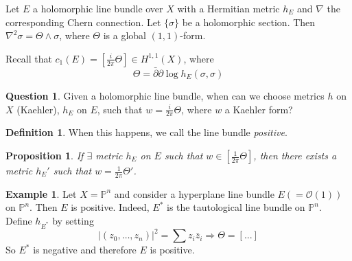 \documentclass[11pt,A4]{article}
\theoremstyle{plain}
\newtheorem{prop}[thm]{Proposition}
\theoremstyle{definition}
\newtheorem{defn}[thm]{Definition}
\newtheorem{exa}[thm]{Example}
\newtheorem{q}[thm]{Question}
\theoremstyle{remark}
\newcommand{\1}{\mathbbm{1}}
\renewcommand{\P}{\mathbb{P}}
\renewcommand{\O}{\mathcal{O}}
\begin{document}
Let $E$ a holomorphic line bundle over $X$ with a Hermitian metric $h_{E}$ and $\nabla$ the corresponding Chern connection.
Let $\{\sigma \}$ be a holomorphic section.
Then $\nabla^{2}\sigma=\Theta \wedge \sigma $, where $\Theta $ is a global $(1,1)$-form.

Recall that $c_{1}(E)=[\frac{i}{2\pi}\Theta ]\in H^{1,1}(X)$, where
\[ \Theta=\bar{\partial}\partial \log h_{E}(\sigma, \sigma) \]

\begin{q}
    Given a holomorphic line bundle, when can we choose metrics $h$ on $X$ (Kaehler), $h_{E}$ on $E$, such that $w=\frac{i}{2\pi}\Theta $, where $w$ a Kaehler form?
\end{q}

\begin{defn}
    When this happens, we call the line bundle \textit{positive}.
\end{defn}

\begin{prop}
    If $\exists$ metric $h_{E}$ on $E$ such that $w\in [\frac{1}{2\pi}\Theta ]$, then there exists a metric $h_{E}'$ such that $w=\frac{1}{2\pi}\Theta'$.
\end{prop}

\begin{exa}
    Let $X=\P^{n}$ and consider a hyperplane line bundle $E(=\O(1))$ on $\P^{n}$.
    Then $E$ is positive.
    Indeed, $E^{*}$ is the tautological line bundle on $\P^{n}$.
    Define $h_{E^{*}}$ by setting
    \[ |(z_{0},\ldots,z_{n})|^{2}=\sum z_{i}\bar{z}_{i} \Rightarrow \Theta= [...]\]
    So $E^{*}$ is negative and therefore $E$ is positive.
\end{exa}
\end{document}
